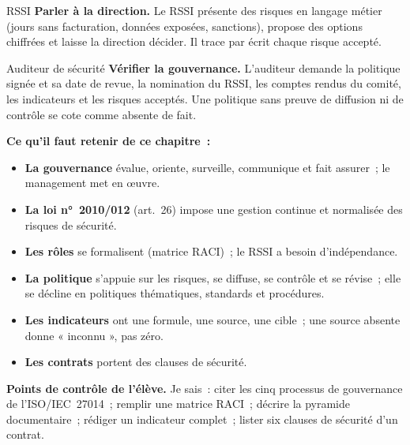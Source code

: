\begin{boxmetier}{RSSI}
\textbf{Parler à la direction.} Le RSSI présente des risques en langage
métier (jours sans facturation, données exposées, sanctions), propose
des options chiffrées et laisse la direction décider. Il trace par écrit
chaque risque accepté.
\end{boxmetier}

\begin{boxmetier}{Auditeur de sécurité}
\textbf{Vérifier la gouvernance.} L'auditeur demande la politique signée
et sa date de revue, la nomination du RSSI, les comptes rendus du comité,
les indicateurs et les risques acceptés. Une politique sans preuve de
diffusion ni de contrôle se cote comme absente de fait.
\end{boxmetier}

\separateur

\begin{boxresume}
\textbf{Ce qu'il faut retenir de ce chapitre~:}
\begin{itemize}
    \item \textbf{La gouvernance} évalue, oriente, surveille, communique
          et fait assurer~; le management met en œuvre.
    \item \textbf{La loi n°~2010/012} (art.~26) impose une gestion continue
          et normalisée des risques de sécurité.
    \item \textbf{Les rôles} se formalisent (matrice RACI)~; le RSSI a
          besoin d'indépendance.
    \item \textbf{La politique} s'appuie sur les risques, se diffuse, se
          contrôle et se révise~; elle se décline en politiques thématiques,
          standards et procédures.
    \item \textbf{Les indicateurs} ont une formule, une source, une cible~;
          une source absente donne « inconnu », pas zéro.
    \item \textbf{Les contrats} portent des clauses de sécurité.
\end{itemize}
\end{boxresume}

\begin{boxinfo}
\textbf{Points de contrôle de l'élève.} Je sais~: citer les cinq
processus de gouvernance de l'ISO/IEC~27014~; remplir une matrice RACI~;
décrire la pyramide documentaire~; rédiger un indicateur complet~; lister
six clauses de sécurité d'un contrat.
\end{boxinfo}

\bigskip

